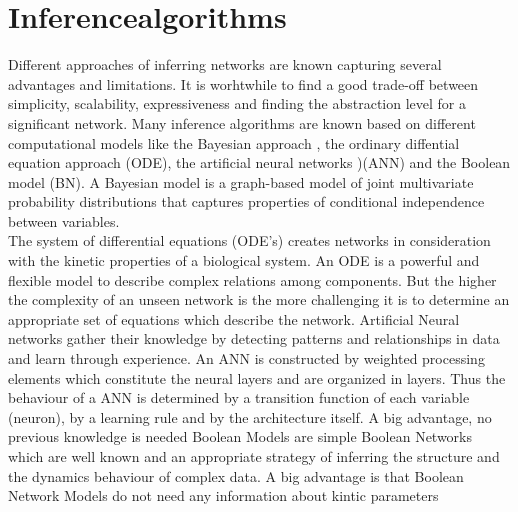 \section{Inferencealgorithms}
Different approaches of inferring networks are known capturing several advantages and limitations.  
It is worhtwhile to find a good trade-off between simplicity, scalability, expressiveness and finding the abstraction level for a significant network. 
Many inference algorithms are known based on different computational models like the Bayesian approach , the ordinary diffential equation approach (ODE), the artificial neural networks )(ANN) and the Boolean model (BN).%
A Bayesian model is a graph-based model of joint multivariate probability distributions that captures properties of conditional independence between variables.\\
The system of differential equations (ODE's) creates networks in consideration with the kinetic properties of a biological system. An ODE is a powerful and flexible model to describe complex relations among components. But the higher the complexity of an unseen network is the more challenging it is to determine an appropriate set of equations which describe the network.
Artificial Neural networks gather their knowledge by detecting patterns and relationships in data and learn through experience. An ANN is constructed by weighted processing elements which constitute the neural layers and are organized in layers. Thus the behaviour of a ANN is determined by a transition function of each variable (neuron), by a learning rule and by the architecture itself. A big advantage, no previous knowledge is needed %
Boolean Models are simple Boolean Networks which are well known and an appropriate strategy of inferring the structure and the dynamics behaviour of complex data. A big advantage is that Boolean Network Models do not need any information about kintic parameters 
